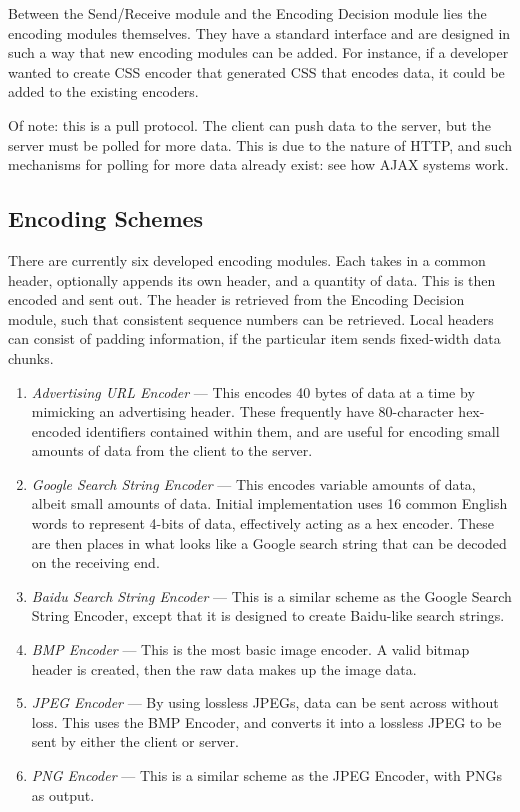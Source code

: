 Between the Send/Receive module and the Encoding Decision module lies the encoding modules themselves. They have a standard interface and are designed in such a way that new encoding modules can be added. For instance, if a developer wanted to create CSS encoder that generated CSS that encodes data, it could be added to the existing encoders.

Of note: this is a pull protocol. The client can push data to the server, but the server must be polled for more data. This is due to the nature of HTTP, and such mechanisms for polling for more data already exist: see how AJAX systems work.

\subsection{Encoding Schemes}
There are currently six developed encoding modules. Each takes in a common header, optionally appends its own header, and a quantity of data. This is then encoded and sent out. The header is retrieved from the Encoding Decision module, such that consistent sequence numbers can be retrieved. Local headers can consist of padding information, if the particular item sends fixed-width data chunks. 

\begin{enumerate}
  \item \emph{Advertising URL Encoder} --- This encodes 40 bytes of data at a time by mimicking an advertising header. These frequently have 80-character hex-encoded identifiers contained within them, and are useful for encoding small amounts of data from the client to the server.
  \item \emph{Google Search String Encoder} --- This encodes variable amounts of data, albeit small amounts of data. Initial implementation uses 16 common English words to represent 4-bits of data, effectively acting as a hex encoder. These are then places in what looks like a Google search string that can be decoded on the receiving end.
  \item \emph{Baidu Search String Encoder} --- This is a similar scheme as the Google Search String Encoder, except that it is designed to create Baidu-like search strings.
  \item \emph{BMP Encoder} --- This is the most basic image encoder. A valid bitmap header is created, then the raw data makes up the image data.
  \item \emph{JPEG Encoder} --- By using lossless JPEGs, data can be sent across without loss. This uses the BMP Encoder, and converts it into a lossless JPEG to be sent by either the client or server.
  \item \emph{PNG Encoder} --- This is a similar scheme as the JPEG Encoder, with PNGs as output.
\end{enumerate}

